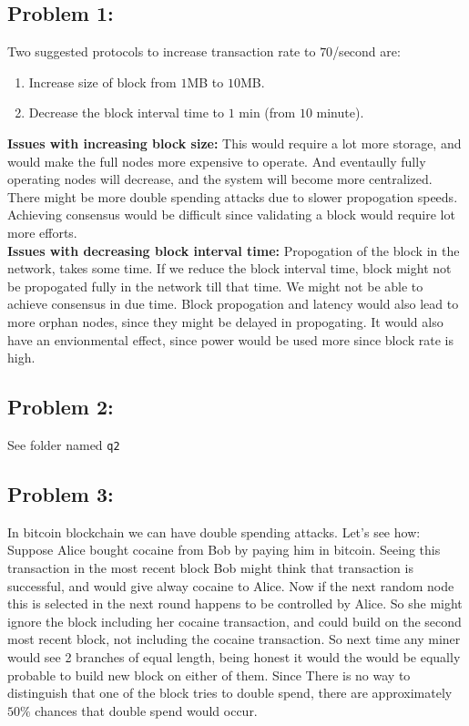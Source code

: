 \documentclass[a4paper]{article}
\begin{document}
\subsection*{Problem 1:}
Two suggested protocols to increase transaction rate to $70$/second are:
\begin{enumerate}
    \item Increase size of block from $1$MB to $10$MB.
    \item Decrease the block interval time to $1$ min (from $10$ minute).
\end{enumerate}
\textbf{Issues with increasing block size:} This would require a lot more storage, and would make the full
            nodes more expensive to operate. And eventaully fully operating nodes will decrease, and the system
            will become more centralized. There might be more double spending attacks due to slower propogation
            speeds. Achieving consensus would be difficult since validating a block would require lot more efforts. \\

\textbf{Issues with decreasing block interval time:} Propogation of the block in the network, takes some time. 
            If we reduce the block interval time, block might not be propogated fully in the network till that time.
            We might not be able to achieve consensus in due time. Block propogation and latency would also lead to more
            orphan nodes, since they might be delayed in propogating. It would also have an envionmental effect, since
            power would be used more since block rate is high.

\subsection*{Problem 2:}
See folder named \texttt{q2}

\subsection*{Problem 3:}
In bitcoin blockchain we can have double spending attacks. Let's see how: \\

Suppose Alice bought cocaine from Bob by paying him in bitcoin. Seeing this transaction in the most
recent block Bob might think that transaction is successful, and would give alway cocaine to Alice.
Now if the next random node this is selected in the next round happens to be controlled by Alice.
So she might ignore the block including her cocaine transaction, and could build on the second most recent block,
not including the cocaine transaction. So next time any miner would see 2 branches of equal length,
being honest it would the would be equally probable to build new block on either of them. Since There
is no way to distinguish that one of the block tries to double spend, there are approximately $50\%$ chances
that double spend would occur.\\
\end{document}
